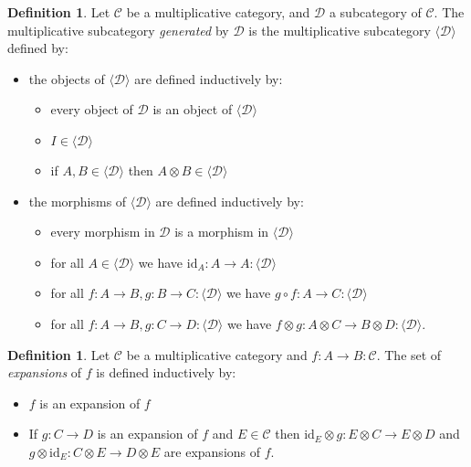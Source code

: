 \documentclass{book}
\theoremstyle{definition}
\newtheorem{df}[lm]{Definition}
\newcommand{\id}[1]{\ensuremath{\mathrm{id}_{#1}}}
\begin{document}
  \begin{df}
    Let $\mathcal{C}$ be a multiplicative category, and $\mathcal{D}$ a 
    subcategory 
    of $\mathcal{C}$. The multiplicative subcategory \emph{generated} by 
    $\mathcal{D}$ is the multiplicative subcategory $\langle \mathcal{D} 
    \rangle$ 
    defined by:
    \begin{itemize}
      \item the objects of $\langle \mathcal{D} \rangle$ are defined inductively 
      by:
      \begin{itemize}
        \item every object of $\mathcal{D}$ is an object of $\langle 
        \mathcal{D} 
        \rangle$
        \item $I \in \langle \mathcal{D} \rangle$
        \item if $A, B \in \langle \mathcal{D} \rangle$ then $A \otimes B \in 
        \langle 
        \mathcal{D} \rangle$
      \end{itemize}
      \item the morphisms of $\langle \mathcal{D} \rangle$ are defined 
      inductively 
      by:
      \begin{itemize}
        \item every morphism in $\mathcal{D}$ is a morphism in $\langle 
        \mathcal{D} 
        \rangle$
        \item for all $A \in \langle \mathcal{D} \rangle$ we have $\id{A} : A 
        \rightarrow A : \langle \mathcal{D} \rangle$
        \item for all $f : A \rightarrow B, g : B \rightarrow C : \langle 
        \mathcal{D} \rangle$ we have $g \circ f : A \rightarrow C : \langle 
        \mathcal{D} 
        \rangle$
        \item for all $f : A \rightarrow B, g : C \rightarrow D : \langle 
        \mathcal{D} 
        \rangle$ we have $f \otimes g : A \otimes C \rightarrow B \otimes D : 
        \langle 
        \mathcal{D} \rangle$.
      \end{itemize}
    \end{itemize}
  \end{df}
  
  \begin{df}
    Let $\mathcal{C}$ be a multiplicative category and $f : A \rightarrow B : 
    \mathcal{C}$. The set of \emph{expansions} of $f$ is defined inductively by:
    \begin{itemize}
      \item $f$ is an expansion of $f$
      \item If $g : C \rightarrow D$ is an expansion of $f$ and $E \in 
      \mathcal{C}$ 
      then $\id{E} \otimes g : E \otimes C \rightarrow E \otimes D$ and $g 
      \otimes 
      \id{E} : C \otimes E \rightarrow D \otimes E$ are expansions of $f$.
    \end{itemize}
  \end{df}
  
\end{document}
